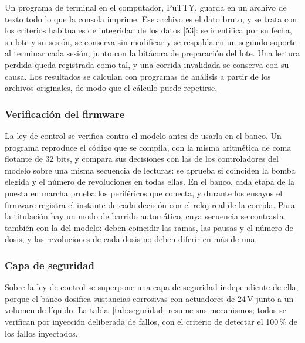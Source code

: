 Un programa de terminal en el computador, PuTTY, guarda en un archivo de texto todo lo que la consola imprime. Ese archivo es el dato bruto, y se trata con los criterios habituales de integridad de los datos [53]: se identifica por su fecha, su lote y su sesión, se conserva sin modificar y se respalda en un segundo soporte al terminar cada sesión, junto con la bitácora de preparación del lote. Una lectura perdida queda registrada como tal, y una corrida invalidada se conserva con su causa. Los resultados se calculan con programas de análisis a partir de los archivos originales, de modo que el cálculo puede repetirse.

\subsubsection{Verificación del firmware}\label{sec:verif}
La ley de control se verifica contra el modelo antes de usarla en el banco. Un programa reproduce el código que se compila, con la misma aritmética de coma flotante de 32 bits, y compara sus decisiones con las de los controladores del modelo sobre una misma secuencia de lecturas: se aprueba si coinciden la bomba elegida y el número de revoluciones en todas ellas. En el banco, cada etapa de la puesta en marcha prueba los periféricos que conecta, y durante los ensayos el firmware registra el instante de cada decisión con el reloj real de la corrida. Para la titulación hay un modo de barrido automático, cuya secuencia se contrasta también con la del modelo: deben coincidir las ramas, las pausas y el número de dosis, y las revoluciones de cada dosis no deben diferir en más de una.

\subsubsection{Capa de seguridad}\label{sec:seg}
Sobre la ley de control se superpone una capa de seguridad independiente de ella, porque el banco dosifica sustancias corrosivas con actuadores de 24\,V junto a un volumen de líquido. La tabla~\ref{tab:seguridad} resume sus mecanismos; todos se verifican por inyección deliberada de fallos, con el criterio de detectar el 100\,\% de los fallos inyectados.


